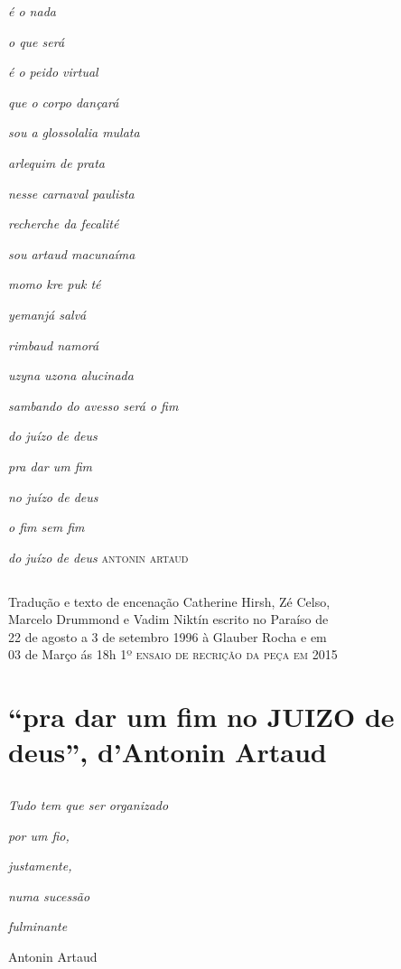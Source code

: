 \emph{é o nada}

\emph{o que será}

\emph{é o peido virtual}

\emph{que o corpo dançará}

\emph{sou a glossolalia mulata}

\emph{arlequim de prata}

\emph{nesse carnaval paulista}

\emph{recherche da fecalité}

\emph{sou artaud macunaíma}

\emph{momo kre puk té}

\emph{yemanjá salvá}

\emph{rimbaud namorá}

\emph{uzyna uzona alucinada}

\emph{sambando do avesso será o fim} \EP[6]

\emph{do juízo de deus}

\emph{pra dar um fim}

\emph{no juízo de deus}

\emph{o fim sem fim}

\emph{do juízo de deus} \hfill\textsc{antonin artaud}

\chapter*{}
\thispagestyle{empty}

\mbox{}\vfill
Tradução e texto de encenação Catherine Hirsh, Zé Celso,\\ Marcelo
Drummond e Vadim Niktín escrito no Paraíso de\\ 22 de agosto a 3 de
setembro 1996 à Glauber Rocha e em\\ 03 de Março ás 18h \textsc{1º ensaio de
recrição da peça em} 2015\textbf{~}


\part[\mbox{“pra dar um fim no JUIZO de deus”, d'Antonin Artaud}]{“pra dar um fim no JUIZO de deus”, d'Antonin Artaud}

\chapter*{}

\mbox{}\vspace*{\fill}
\begin{center}
\emph{Tudo tem que ser organizado}

\emph{por um fio,}

\emph{justamente,}

\emph{numa sucessão}

\emph{fulminante}

Antonin Artaud
\end{center}
\mbox{}\vspace*{\fill}
\pagebreak

